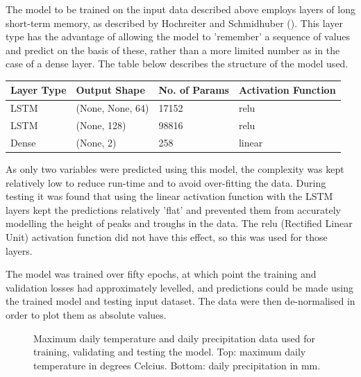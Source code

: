 \documentclass[12pt]{article}
\begin{document}
    The model to be trained on the input data described above employs layers of long short-term memory, as described by Hochreiter and 
    Schmidhuber (\cite{hochreiter_1997_long}). This layer type has the advantage of allowing the model to 'remember' a sequence of values 
    and predict on the basis of these, rather than a more limited number as in the case of a dense layer. The table below describes the 
    structure of the model used.
    
    \begin{table}[H]
    \centering
        \begin{tabular}{ |p{2.5cm}|p{4cm}|p{3.5cm}|p{4cm}| }
         \hline
         Layer Type & Output Shape & No. of Params & Activation Function \\
         \hline
         LSTM  & (None, None, 64) &  17152 & relu   \\
         LSTM  & (None, 128)      &  98816 & relu   \\
         Dense & (None, 2)        &  258   & linear \\
         \hline
        \end{tabular}
    \end{table}

    As only two variables were predicted using this model, the complexity was kept relatively low to reduce run-time and to avoid over-fitting 
    the data. During testing it was found that using the linear activation function with the LSTM layers kept the predictions relatively 'flat' 
    and prevented them from accurately modelling the height of peaks and troughs in the data. The relu (Rectified Linear Unit) activation 
    function did not have this effect, so this was used for those layers. 

    The model was trained over fifty epochs, at which point the training and validation losses had approximately levelled, and predictions could 
    be made using the trained model and testing input dataset. The data were then de-normalised in order to plot them as absolute values.
    
    \begin{figure}
        \centering
        
        \caption{Maximum daily temperature and daily precipitation data used for training, validating and testing the model. Top: maximum daily 
        temperature in degrees Celcius. Bottom: daily precipitation in mm.}
        \label{fig:weather_input_data}
    \end{figure}
\end{document}

